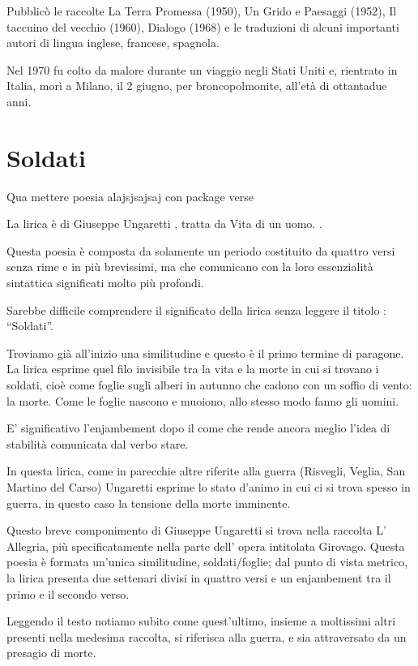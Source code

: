 Pubblicò le raccolte La Terra Promessa (1950), Un Grido e Paesaggi (1952), Il taccuino del vecchio (1960), Dialogo (1968) e le traduzioni di alcuni importanti autori di lingua inglese, francese, spagnola.

Nel 1970 fu colto da malore durante un viaggio negli Stati Uniti e, rientrato in Italia, morì a Milano, il 2 giugno, per broncopolmonite, all’età di ottantadue anni.

\section{Soldati}
Qua mettere poesia alajsjsajsaj con package verse

La lirica è di Giuseppe Ungaretti , tratta da Vita di un uomo. .

Questa poesia è composta da solamente un periodo costituito da quattro versi senza rime e in più brevissimi, ma che comunicano con la loro essenzialità sintattica significati molto più profondi.

Sarebbe difficile comprendere il significato della lirica senza leggere il titolo : “Soldati”.

Troviamo già all’inizio una similitudine e questo è il primo termine di paragone. La lirica esprime quel filo invisibile tra la vita e la morte in cui si trovano i soldati, cioè come foglie sugli alberi in autunno che cadono con un soffio di vento: la morte. Come le foglie nascono e muoiono, allo stesso modo fanno gli uomini.

E’ significativo l’enjambement dopo il come che rende ancora meglio l’idea di stabilità comunicata dal verbo stare.

In questa lirica, come in parecchie altre riferite alla guerra (Risvegli, Veglia, San Martino del Carso) Ungaretti esprime lo stato d’animo in cui ci si trova spesso in guerra, in questo caso la tensione della morte imminente.

Questo breve componimento di Giuseppe Ungaretti  si trova nella raccolta L’ Allegria, più specificatamente nella parte dell’ opera intitolata Girovago. Questa poesia è formata un’unica similitudine, soldati/foglie; dal punto di vista metrico, la lirica presenta due settenari divisi in quattro versi e un enjambement tra il primo e il secondo verso.

Leggendo il testo notiamo subito come quest’ultimo, insieme a moltissimi altri presenti nella medesima raccolta, si riferisca alla guerra, e sia attraversato da un presagio di morte.

